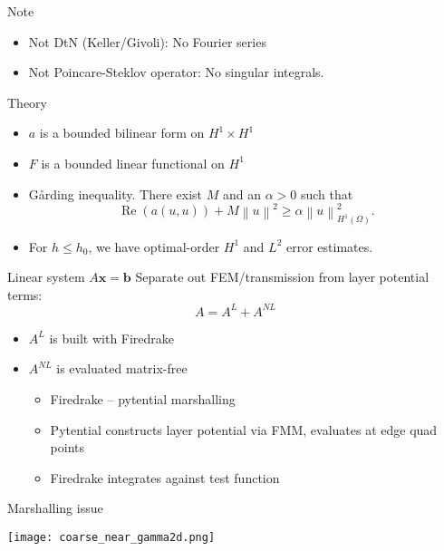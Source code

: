 \documentclass{beamer}
\newcommand{\bfb}{\mathbf{b}}
\newcommand{\bfx}{\mathbf{x}}
\begin{document}
\begin{frame}{Note}
  \begin{itemize}
  \item<2-> Not DtN (Keller/Givoli): No Fourier series
  \item<3-> Not Poincare-Steklov operator: No singular integrals.
  \end{itemize}
\end{frame}

\begin{frame}{Theory}
  \begin{itemize}
  \item<2-> $a$ is a bounded bilinear form on $H^1 \times H^1$
  \item<3-> $F$ is a bounded linear functional on $H^1$
  \item<4-> G{\aa}rding inequality.  There exist $M$ and an $\alpha > 0$ such that
\begin{equation*}
\operatorname{Re}(a(u,u)) + M \left\| u \right\|^2 \geq \alpha \left\| u \right\|_{H^1(\Omega)}^2.
\end{equation*}
\item<5-> For $h \leq h_0$, we have optimal-order $H^1$ and $L^2$ error estimates.
  \end{itemize}
\end{frame}

\begin{frame}{Linear system \( A \bfx = \bfb \)}
  Separate out FEM/transmission from layer potential terms:
  \[ A = A^L + A^{NL} \]
  \begin{itemize}
  \item<2-> $A^L$ is built with Firedrake
  \item<3-> $A^{NL}$ is evaluated matrix-free
    \begin{itemize}
    \item<4-> Firedrake -- pytential marshalling
    \item<5-> Pytential constructs layer potential via FMM, evaluates at edge quad points
    \item<6-> Firedrake integrates against test function
    \end{itemize}
  \end{itemize}
\end{frame}

\begin{frame}{Marshalling issue}
  \begin{center}
    \texttt{[image: coarse\_near\_gamma2d.png]}
  \end{center}
\end{frame}
\end{document}
